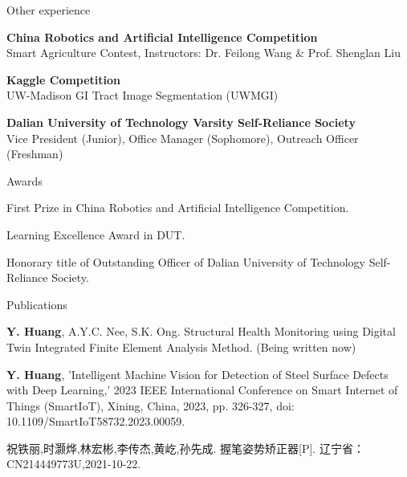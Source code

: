 \documentclass{resume} %
\begin{document}
\begin{rSection}{Other experience}

\begin{rSubsection}{}{}
	{}{}
\item {{\bf China Robotics and Artificial Intelligence Competition}\\ Smart Agriculture Contest, Instructors: Dr. Feilong Wang \& Prof. Shenglan Liu}\\

\item {{\bf Kaggle Competition}\\UW-Madison GI Tract Image Segmentation (UWMGI)}\\

\item {{\bf Dalian University of Technology Varsity Self-Reliance Society}\\Vice President (Junior), Office Manager (Sophomore), Outreach Officer (Freshman)}\\
\end{rSubsection}

\end{rSection}

\begin{rSection}{Awards}

\begin{rSubsection}{}{}
{}{}
  \item {First Prize in China Robotics and Artificial Intelligence Competition.}\\
  \item {Learning Excellence Award in DUT.}\\
  \item {Honorary title of Outstanding Officer of Dalian University of Technology Self-Reliance Society.}\\
\end{rSubsection}
\end{rSection}

\begin{rSection}{Publications}
\begin{rSubsection}{}{}
{}{}
	\item { {\bf Y. Huang}, A.Y.C. Nee, S.K. Ong. Structural Health Monitoring using Digital Twin Integrated Finite Element Analysis Method. (Being written now) }\\
	\item {{\bf Y. Huang}, 'Intelligent Machine Vision for Detection of Steel Surface Defects with Deep Learning,' 2023 IEEE International Conference on Smart Internet of Things (SmartIoT), Xining, China, 2023, pp. 326-327, doi: 10.1109/SmartIoT58732.2023.00059.}\\
  \item {\fangsong 祝铁丽,时灏烨,林宏彬,李传杰,黄屹,孙先成. 握笔姿势矫正器[P]. 辽宁省：CN214449773U,2021-10-22.}\\
\end{rSubsection}
\end{rSection}


\end{document}

